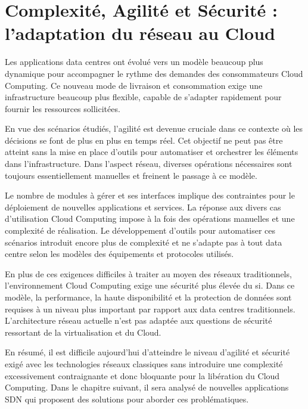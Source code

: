 \cite{cloudSecurityThreats}


\section{Complexité, Agilité et Sécurité : l'adaptation du réseau au Cloud}

Les applications data centres ont évolué vers un modèle beaucoup plus dynamique pour accompagner le rythme des demandes des consommateurs Cloud Computing. Ce nouveau mode de livraison et consommation exige une infrastructure beaucoup plus flexible, capable de s'adapter rapidement pour fournir les ressources sollicitées. 

En vue des scénarios étudiés, l'agilité est devenue cruciale dans ce contexte où les décisions se font de plus en plus en temps réel. Cet objectif ne peut pas être atteint sans la mise en place d'outils pour automatiser et orchestrer les éléments dans l'infrastructure. Dans l'aspect réseau, diverses opérations nécessaires sont toujours essentiellement manuelles et freinent le passage à ce modèle.

Le nombre de modules à gérer et ses interfaces implique des contraintes pour le déploiement de nouvelles applications et services. La réponse aux divers cas d'utilisation Cloud Computing impose à la fois des opérations manuelles et une complexité de réalisation. Le développement d'outils pour automatiser ces scénarios introduit encore plus de complexité et ne s'adapte pas à tout data centre selon les modèles des équipements et protocoles utilisés.

En plus de ces exigences difficiles à traiter au moyen des réseaux traditionnels, l'environnement Cloud Computing exige une sécurité plus élevée du \gls{si}. Dans ce modèle, la performance, la haute disponibilité et la protection de données sont requises à un niveau plus important par rapport aux data centres traditionnels. L'architecture réseau actuelle n'est pas adaptée aux questions de sécurité ressortant de la virtualisation et du Cloud.

En résumé, il est difficile aujourd'hui d'atteindre le niveau d'agilité et sécurité exigé avec les technologies réseaux classiques sans introduire une complexité excessivement contraignante et donc bloquante pour la libération du Cloud Computing. Dans le chapitre suivant, il sera analysé de nouvelles applications SDN qui proposent des solutions pour aborder ces problématiques. 